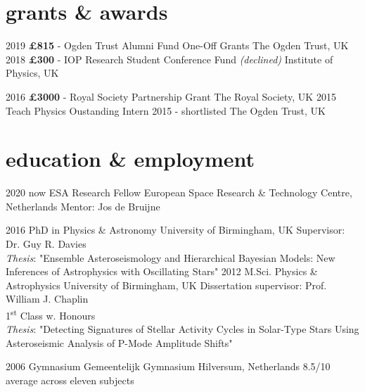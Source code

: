 \documentclass[letterpaper]{k-cv} %
\begin{document}
\section{\color{c4}grants \& awards}

\begin{entrylist}
	\entrythree
	{2019}
	{\textbf{\textcolor{c4}{\pounds 815}} - Ogden Trust Alumni Fund One-Off Grants}
	{The Ogden Trust, UK}
	\entrythree
	{2018}
	{\textbf{\textcolor{c4}{\pounds 300}} - IOP Research Student Conference Fund \emph{(declined)}}
	{Institute of Physics, UK}
	
	\entrythree
	{2016}
	{\textbf{\textcolor{c4}{\pounds 3000}} - Royal Society Partnership Grant}
	{The Royal Society, UK}
	\entrythree
	{2015}
	{Teach Physics Oustanding Intern 2015 - shortlisted}
	{The Ogden Trust, UK}
	
\end{entrylist}



\section{\color{c1}education \& employment}

\begin{entrylist}
\centry
{2020 \to now}
{ESA Research Fellow}
{European Space Research \& Technology Centre, Netherlands}
{Mentor: Jos de Bruijne}
	
\centry
{2016 }
{PhD {\normalfont in Physics \& Astronomy}}
{University of Birmingham, UK}
{Supervisor: Dr. Guy R. Davies\\
\textit{Thesis}: "Ensemble Asteroseismology and Hierarchical Bayesian Models: New Inferences of Astrophysics with Oscillating Stars"} 
\centry
{2012 }
{M.Sci. {\normalfont Physics \& Astrophysics}}
{University of Birmingham, UK}
{Dissertation supervisor: Prof. William J. Chaplin\\
1\textsuperscript{st} Class w. Honours\\ \textit{Thesis}: "Detecting Signatures of Stellar Activity Cycles in Solar-Type Stars Using Asteroseismic Analysis of P-Mode Amplitude Shifts"}



\centry
{2006 }
{Gymnasium}
{Gemeentelijk Gymnasium Hilversum, Netherlands}
{8.5/10 average across eleven subjects}
\end{entrylist}
\end{document}
